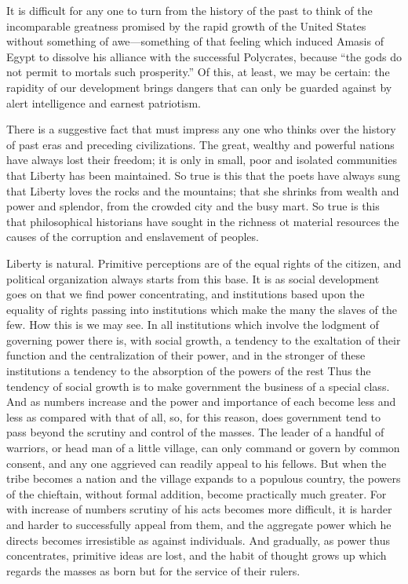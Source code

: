 \documentclass{book}
\begin{document}
It is difficult for any one to turn from the history of the past to think of the incomparable greatness promised by the rapid growth of the United States without something of awe—something of that feeling which induced Amasis of Egypt to dissolve his alliance with the successful Polycrates, because “the gods do not permit to mortals such prosperity.” Of this, at least, we may be certain: the rapidity of our development brings dangers that can only be guarded against by alert intelligence and earnest patriotism.

There is a suggestive fact that must impress any one who thinks over the history of past eras and preceding civilizations. The great, wealthy and powerful nations have always lost their freedom; it is only in small, poor and isolated communities that Liberty has been maintained. So true is this that the poets have always sung that Liberty loves the rocks and the mountains; that she shrinks from wealth and power and splendor, from the crowded city and the busy mart. So true is this that philosophical historians have sought in the richness ot material resources the causes of the corruption and enslavement of peoples.

Liberty is natural. Primitive perceptions are of the equal rights of the citizen, and political organization always starts from this base. It is as social development goes on that we find power concentrating, and institutions based upon the equality of rights passing into institutions which make the many the slaves of the few. How this is we may see. In all institutions which involve the lodgment of governing power there is, with social growth, a tendency to the exaltation of their function and the centralization of their power, and in the stronger of these institutions a tendency to the absorption of the powers of the rest Thus the tendency of social growth is to make government the business of a special class. And as numbers increase and the power and importance of each become less and less as compared with that of all, so, for this reason, does government tend to pass beyond the scrutiny and control of the masses. The leader of a handful of warriors, or head man of a little village, can only command or govern by common consent, and any one aggrieved can readily appeal to his fellows. But when the tribe becomes a nation and the village expands to a populous country, the powers of the chieftain, without formal addition, become practically much greater. For with increase of numbers scrutiny of his acts becomes more difficult, it is harder and harder to successfully appeal from them, and the aggregate power which he directs becomes irresistible as against individuals. And gradually, as power thus concentrates, primitive ideas are lost, and the habit of thought grows up which regards the masses as born but for the service of their rulers.
\end{document}

